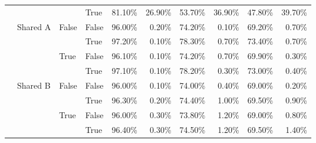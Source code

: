 \begin{table}[h]
\begin{tabular}{llllrrrrrr}
 &  &  & True & 81.10\% & 26.90\% & 53.70\% & 36.90\% & 47.80\% & 39.70\% \\
\cline{2-10} \cline{3-10}
 & \multirow[t]{4}{*}{Shared A} & \multirow[t]{2}{*}{False} & False & 96.00\% & 0.20\% & 74.20\% & 0.10\% & 69.20\% & 0.70\% \\
 &  &  & True & 97.20\% & 0.10\% & 78.30\% & 0.70\% & 73.40\% & 0.70\% \\
\cline{3-10}
 &  & \multirow[t]{2}{*}{True} & False & 96.10\% & 0.10\% & 74.20\% & 0.70\% & 69.90\% & 0.30\% \\
 &  &  & True & 97.10\% & 0.10\% & 78.20\% & 0.30\% & 73.00\% & 0.40\% \\
\cline{2-10} \cline{3-10}
 & \multirow[t]{4}{*}{Shared B} & \multirow[t]{2}{*}{False} & False & 96.00\% & 0.10\% & 74.00\% & 0.40\% & 69.00\% & 0.20\% \\
 &  &  & True & 96.30\% & 0.20\% & 74.40\% & 1.00\% & 69.50\% & 0.90\% \\
\cline{3-10}
 &  & \multirow[t]{2}{*}{True} & False & 96.00\% & 0.30\% & 73.80\% & 1.20\% & 69.00\% & 0.80\% \\
 &  &  & True & 96.40\% & 0.30\% & 74.50\% & 1.20\% & 69.50\% & 1.40\% \\
\cline{1-10} \cline{2-10} \cline{3-10}
\bottomrule
\end{tabular}
\end{table}
